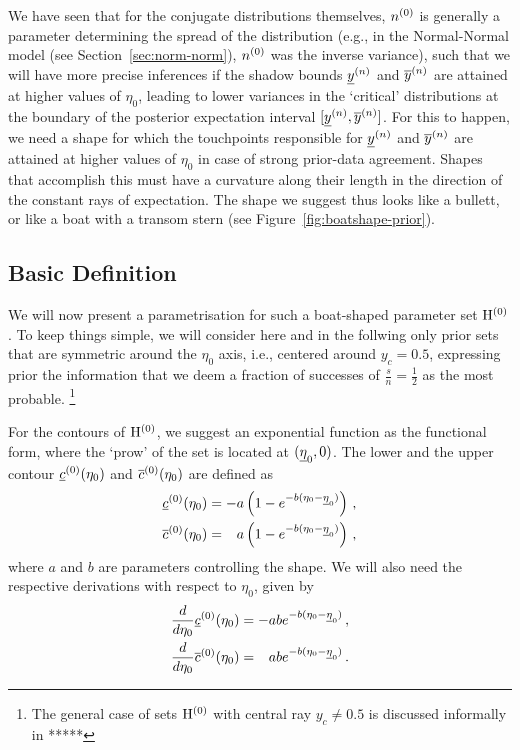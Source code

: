 We have seen that for the conjugate distributions themselves,
$n^{(0)}$ is generally a parameter determining the spread of the distribution
(e.g., in the Normal-Normal model (see Section~\ref{sec:norm-norm}), $n^{(0)}$ was the inverse variance),
such that we will have more precise inferences if the shadow bounds $\underline{y}^{(n)}$ and $\overline{y}^{(n)}$
are attained at higher values of $\eta_0$, leading to lower variances in the
`critical' distributions at the boundary of the posterior expectation interval $[\underline{y}^{(n)},\overline{y}^{(n)}]$.
For this to happen, we need a shape for which the touchpoints responsible for $\underline{y}^{(n)}$ and $\overline{y}^{(n)}$
are attained at higher values of $\eta_0$ in case of strong prior-data agreement.
Shapes that accomplish this must have a curvature along their length in the direction
of the constant rays of expectation.
The shape we suggest thus looks like a bullett, or like a boat with a transom stern
(see Figure~\ref{fig:boatshape-prior}).

\subsection{Basic Definition}
\label{sec:basicdefboat}

We will now present a parametrisation for such a boat-shaped parameter set $\mathrm{H}^{(0)}$.
To keep things simple, we will consider here and in the follwing only prior sets
that are symmetric around the $\eta_0$ axis, i.e., centered around $y_c = 0.5$,
expressing prior the information that we deem a fraction of successes of $\frac{s}{n} = \frac{1}{2}$
as the most probable.%
\footnote{The general case of sets $\mathrm{H}^{(0)}$ with central ray $y_c \neq 0.5$
is discussed informally in *****}

For the contours of $\mathrm{H}^{(0)}$, we suggest an exponential function as the functional form,
where the `prow' of the set is located at $(\underline{\eta}_0, 0)$.
The lower and the upper contour $\underline{c}^{(0)}(\eta_0)$ and $\overline{c}^{(0)}(\eta_0)$ are defined as
\begin{align*}
\czl(\eta_0) &= -a \left( 1 - e^{-b(\eta_0 - \ezl)} \right)\,, \\
\czu(\eta_0) &= \phantom{-}%
                 a \left( 1 - e^{-b(\eta_0 - \ezl)} \right)\,, 
\end{align*}
where $a$ and $b$ are parameters controlling the shape.
We will also need the respective derivations with respect to $\eta_0$, given by
\begin{align*}
\frac{d}{d\eta_0} \czl(\eta_0) &= -ab e^{-b(\eta_0 - \ezl)}\,, \\
\frac{d}{d\eta_0} \czu(\eta_0) &= \phantom{-}%
                                   ab e^{-b(\eta_0 - \ezl)}\,.
\end{align*}

